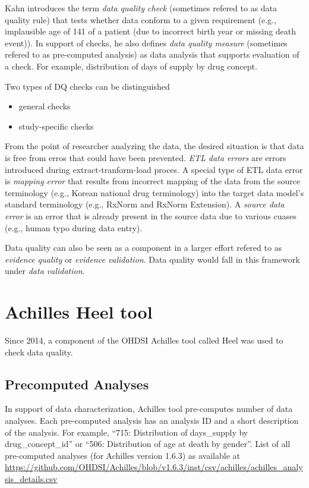 \documentclass[11pt]{book}
\providecommand{\tightlist}{%
  \setlength{\itemsep}{0pt}\setlength{\parskip}{0pt}}
\begin{document}
Kahn introduces the term \emph{data quality check} (sometimes refered to
as data quality rule) that tests whether data conform to a given
requirement (e.g., implausible age of 141 of a patient (due to incorrect
birth year or missing death event)). In support of checks, he also
defines \emph{data quality measure} (sometimes refered to as
pre-computed analysis) as data analysis that supports evaluation of a
check. For example, distribution of days of supply by drug concept.

Two types of DQ checks can be distinguished\citep{weiskopf_methods_2013}

\begin{itemize}
\tightlist
\item
  general checks
\item
  study-specific checks
\end{itemize}

From the point of researcher analyzing the data, the desired situation
is that data is free from erros that could have been prevented.
\emph{ETL data errors} are errors introduced during
extract-tranform-load proces. A special type of ETL data error is
\emph{mapping error} that results from incorrect mapping of the data
from the source terminology (e.g., Korean national drug terminology)
into the target data model's standard terminology (e.g., RxNorm and
RxNorm Extension). A \emph{source data error} is an error that is
already present in the source data due to various cuases (e.g., human
typo during data entry).

Data quality can also be seen as a component in a larger effort refered
to as \emph{evidence quality} or \emph{evidence validation}. Data
quality would fall in this framework under \emph{data validation}.

\section{Achilles Heel tool}\label{achilles-heel-tool}

Since 2014, a component of the OHDSI Achilles tool called Heel was used
to check data quality.\citep{huser_methods_2018}

\subsection{Precomputed Analyses}\label{precomputed-analyses}

In support of data characterization, Achilles tool pre-computes number
of data analyses. Each pre-computed analysis has an analysis ID and a
short description of the analysis. For example, ``715: Distribution of
days\_supply by drug\_concept\_id'' or ``506: Distribution of age at
death by gender''. List of all pre-computed analyses (for Achilles
version 1.6.3) as available at
\url{https://github.com/OHDSI/Achilles/blob/v1.6.3/inst/csv/achilles/achilles_analysis_details.csv}
\end{document}
